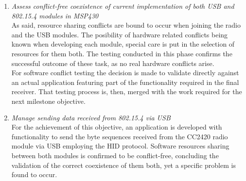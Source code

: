 		\begin{enumerate}
		\item\emph{Assess conflict-free coexistence of current implementation of both USB and 802.15.4 modules in MSP430}\\

		As said, resource sharing conflicts are bound to occur when joining the radio and the USB modules. The posibility of hardware related conflicts being known when developing each module, special care is put in the selection of resources for them both. The testing conducted in this phase confirms the successful outcome of these task, as no real hardware conflicts arise.\\

		For software conflict testing the decision is made to validate directly against an actual application featuring part of the functionality required in the final receiver. That testing process is, then, merged with the work required for the next milestone objective.\\


		\item\emph{Manage sending data received from 802.15.4 via USB}\\

			For the achievement of this objective, an application is developed with functionality to send the byte sequences received from the CC2420 radio module via USB employing the HID protocol. Software resources sharing between both modules is confirmed to be conflict-free, concluding the validation of the correct coexistence of them both, yet a specific problem is found to occur.\\


\end{enumerate}
